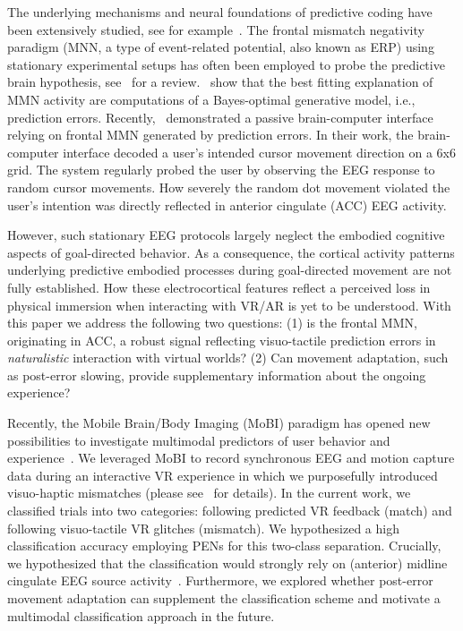 The underlying mechanisms and neural foundations of predictive coding have been extensively studied, see for example~\cite{Holroyd2002-in, Clark2013-ah, Bendixen2012-jx}. The frontal mismatch negativity paradigm (MNN, a type of event-related potential, also known as ERP) using stationary experimental setups has often been employed to probe the predictive brain hypothesis, see~\cite{Stefanics2014-vk} for a review.~\cite{Lieder2013-dl} show that the best fitting explanation of MMN activity are computations of a Bayes-optimal generative model, i.e., prediction errors. Recently,~\cite{Zander2016-ed} demonstrated a passive brain-computer interface relying on frontal MMN generated by prediction errors. In their work, the brain-computer interface decoded a user's intended cursor movement direction on a 6x6 grid. The system regularly probed the user by observing the EEG response to random cursor movements. How severely the random dot movement violated the user's intention was directly reflected in anterior cingulate (ACC) EEG activity. 

However, such stationary EEG protocols largely neglect the embodied cognitive aspects of goal-directed behavior. As a consequence, the cortical activity patterns underlying predictive embodied processes during goal-directed movement are not fully established. How these electrocortical features reflect a perceived loss in physical immersion when interacting with VR/AR is yet to be understood. With this paper we address the following two questions: (1) is the frontal MMN, originating in ACC, a robust signal reflecting visuo-tactile prediction errors in \textit{naturalistic} interaction with virtual worlds? (2) Can movement adaptation, such as post-error slowing, provide supplementary information about the ongoing experience?

Recently, the Mobile Brain/Body Imaging (MoBI) paradigm has opened new possibilities to investigate multimodal predictors of user behavior and experience~\cite{Makeig2009-je, Gramann2011-fr, Gramann2014-qo, Jungnickel2019-mv}. We leveraged MoBI to record synchronous EEG and motion capture data during an interactive VR experience in which we purposefully introduced visuo-haptic mismatches (please see~\cite{Gehrke2019-og} for details). In the current work, we classified trials into two categories: following predicted VR feedback (match) and following visuo-tactile VR glitches (mismatch). We hypothesized a high classification accuracy employing PENs for this two-class separation. Crucially, we hypothesized that the classification would strongly rely on (anterior) midline cingulate EEG source activity~\cite{Zander2016-ed, Tollner2017-rm}. Furthermore, we explored whether post-error movement adaptation can supplement the classification scheme and motivate a multimodal classification approach in the future. 


